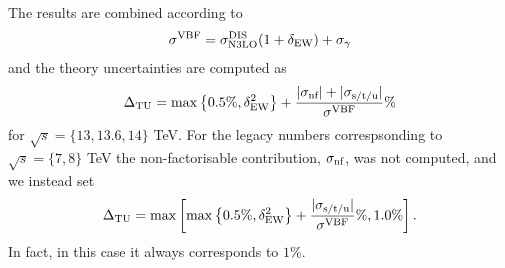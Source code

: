 The results are combined according to
\begin{align}
  \label{eq:vbf-xsec-combined}
  \sigma^{\mathrm{VBF}} = \sigma_{\mathrm{N3LO}}^{\mathrm{DIS}} (1+\delta_{\mathrm{EW}}) + \sigma_{\gamma}
\end{align}
and the theory uncertainties are computed as
\begin{align}
  \label{eq:vbf-TU}
  \Delta_{\mathrm{TU}} = \max\left\{0.5\%,\delta_{\mathrm{EW}}^2\right\} + \frac{|\sigma_{\mbox{\scriptsize nf}}| + |\sigma_{\mbox{\scriptsize s/t/u}}|}{\sigma^{\mathrm{VBF}}}\%
\end{align}
for $\sqrt{s}=\{13,13.6,14\}$ TeV. For the legacy numbers correspsonding to $\sqrt{s}=\{7,8\}$ TeV the non-factorisable contribution, $\sigma_{\mbox{\scriptsize nf}}$, was not computed, and we instead set
\begin{align}
  \label{eq:vbf-TU}
  \Delta_{\mathrm{TU}} = \max\left[\max\left\{0.5\%,\delta_{\mathrm{EW}}^2\right\} + \frac{|\sigma_{\mbox{\scriptsize s/t/u}}|}{\sigma^{\mathrm{VBF}}}\%,1.0\%\right].
\end{align}
In fact, in this case it always corresponds to $1\%$.
